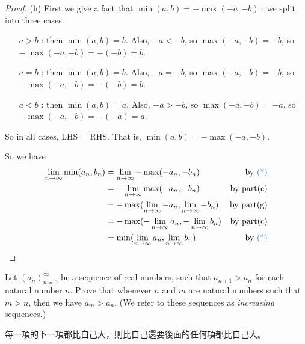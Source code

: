 \begin{proof}(h)
First we give a fact that \(\min(a, b) = -\max(-a, -b)\) \BLUE{(*)};
we split into three cases:
\begin{itemize}
    \item[\(a > b\)]: then \(\min(a, b) = b\).
        Also, \(-a < -b\), so \(\max(-a, -b) = -b\), so \(-\max(-a, -b) = -(-b) = b\).
    \item[\(a = b\)]: then \(\min(a, b) = b\).
        Also, \(-a = -b\), so \(\max(-a, -b) = -b\), so \(-\max(-a, -b) = -(-b) = b\).
    \item[\(a < b\)]: then \(\min(a, b) = a\).
        Also, \(-a > -b\), so \(\max(-a, -b) = -a\), so \(-\max(-a, -b) = -(-a) = a\).
\end{itemize}
So in all cases, LHS = RHS. That is, \(\min(a, b) = -\max(-a, -b)\).

So we have
\begin{align*}
    \lim_{n \toINF} \min(a_n, b_n) & = \lim_{n \toINF} -\max(-a_n, -b_n) & \text{by \BLUE{(*)}} \\
                                   & = -\lim_{n \toINF} \max(-a_n, -b_n) & \text{by part(c)} \\
                                   & = -\max(\lim_{n \toINF} -a_n, \lim_{n \toINF} -b_n) & \text{by part(g)} \\
                                   & = -\max(-\lim_{n \toINF} a_n, -\lim_{n \toINF} b_n) & \text{by part(c)} \\
                                   & = \min(\lim_{n \toINF} a_n, \lim_{n \toINF} b_n) & \text{by \BLUE{(*)}}
\end{align*}
\end{proof}

\exercisesection

\begin{exercise} \label{exercise 6.1.1}
Let \((a_n)_{n = 0}^{\infty}\) be a sequence of real numbers, such that \(a_{n + 1} > a_n\) for each natural number \(n\).
Prove that whenever \(n\) and \(m\) are natural numbers such that \(m > n\), then we have \(a_m > a_n\).
(We refer to these sequences as \emph{increasing} sequences.)
\end{exercise}

\begin{note}
每一項的下一項都比自己大，則比自己還要後面的任何項都比自己大。
\end{note}

